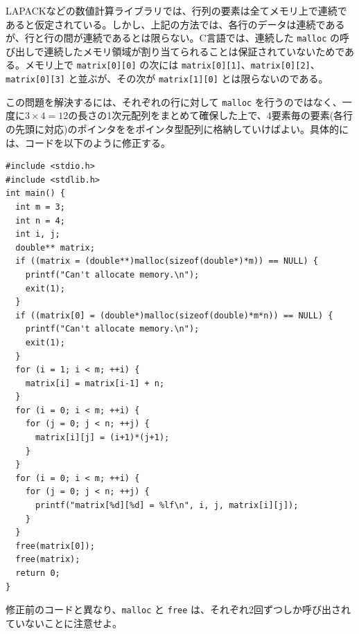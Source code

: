 LAPACKなどの数値計算ライブラリでは、行列の要素は全てメモリ上で連続であると仮定されている。しかし、上記の方法では、各行のデータは連続であるが、行と行の間が連続であるとは限らない。C言語では、連続した \verb|malloc| の呼び出しで連続したメモリ領域が割り当てられることは保証されていないためである。メモリ上で \verb|matrix[0][0]| の次には \verb|matrix[0][1]|、\verb|matrix[0][2]|、\verb|matrix[0][3]| と並ぶが、その次が \verb|matrix[1][0]| とは限らないのである。

この問題を解決するには、それぞれの行に対して \verb|malloc| を行うのではなく、一度に$3 \times 4=12$の長さの1次元配列をまとめて確保した上で、4要素毎の要素(各行の先頭に対応)のポインタををポインタ型配列に格納していけばよい。具体的には、コードを以下のように修正する。
\begin{reidai}\label{ex:malloc-2dim-continuous}
\begin{verbatim}
#include <stdio.h>
#include <stdlib.h>
int main() {
  int m = 3;
  int n = 4;
  int i, j;
  double** matrix;
  if ((matrix = (double**)malloc(sizeof(double*)*m)) == NULL) {
    printf("Can't allocate memory.\n");
    exit(1);
  }
  if ((matrix[0] = (double*)malloc(sizeof(double)*m*n)) == NULL) {
    printf("Can't allocate memory.\n");
    exit(1);
  }
  for (i = 1; i < m; ++i) {
    matrix[i] = matrix[i-1] + n;
  }
  for (i = 0; i < m; ++i) {
    for (j = 0; j < n; ++j) {
      matrix[i][j] = (i+1)*(j+1);
    }
  }
  for (i = 0; i < m; ++i) {
    for (j = 0; j < n; ++j) {
      printf("matrix[%d][%d] = %lf\n", i, j, matrix[i][j]);
    }
  }
  free(matrix[0]);
  free(matrix);
  return 0;
}
\end{verbatim}
\end{reidai} \noindent
修正前のコードと異なり、\verb|malloc| と \verb|free| は、それぞれ2回ずつしか呼び出されていないことに注意せよ。

